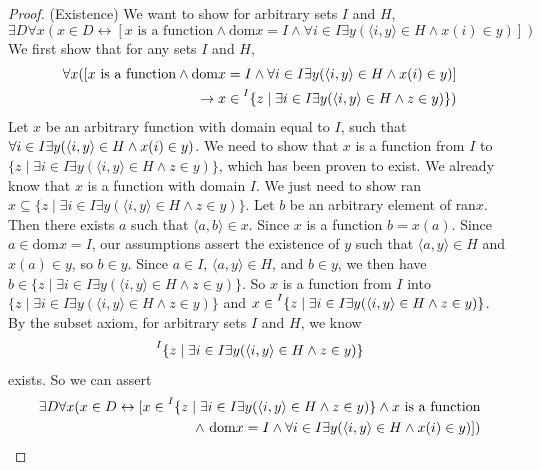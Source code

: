 \documentclass{report}
\begin{document}
\begin{proof}(Existence) 
We want to show for arbitrary sets $I$ and $H$,
\begin{equation*}
\exists D\forall x(x\in D\leftrightarrow[x\text{ is a function}\land\text{dom}x=I\land\forall i\in I\exists y(\langle i,y\rangle\in H\land x(i)\in y)])
\end{equation*}
We first show that for any sets $I$ and $H$,
\begin{align*}
\forall x([x\text{ is a function}\land\text{dom}x=I\land\forall i\in I\exists y(\langle i,y\rangle\in H\land x(i)\in y)]\\\to x\in\prescript{I}{}{\{z\mid\exists i\in I\exists 
y(\langle i,y\rangle\in H\land z\in y)\}})
\end{align*}
Let $x$ be an arbitrary function with domain equal to $I$, such that $\forall i\in I\exists y(\langle i,y\rangle\\\in H\land x(i)\in y)$. We need to show that $x$ is a function from $I$ to 
$\{z\mid\exists i\in I\exists y(\langle i,y\rangle\in H\land z\in y)\}$, which has been proven to exist. 
We already know that $x$ is a function with domain $I$. We just need to show ran$x\subseteq\{z\mid\exists i\in I\exists y(\langle i,y\rangle\in H\land z\in y)\}$. 
Let $b$ be an arbitrary element of ran$x$. Then there exists $a$ such that $\langle a,b\rangle\in x$. Since $x$ is a function $b=x(a)$. Since $a\in\text{dom}x=I$, our assumptions 
assert the existence of $y$ such that $\langle a,y\rangle\in H$ and $x(a)\in y$, so $b\in y$.
Since $a\in I$, $\langle a,y\rangle\in H$, and $b\in y$, we then have $b\in \{z\mid\exists i\in I\exists y(\langle i,y\rangle\in H\land z\in y)\}$. 
So $x$ is a function from $I$ into $\{z\mid\exists i\in I\exists y(\langle i,y\rangle\in H\land z\in y)\}$ and 
$x\in\prescript{I}{}{\{z\mid\exists i\in I\exists y(\langle i,y\rangle\in H\land z\in y)\}}$.\\
\indent By the subset axiom, for arbitrary sets $I$ and $H$, we know 
\begin{equation*}
\prescript{I}{}{\{z\mid\exists i\in I\exists y(\langle i,y\rangle\in H\land z\in y)\}}
\end{equation*}
exists. So we can assert
\begin{align*}
\exists D\forall x(x\in D\leftrightarrow[x\in\prescript{I}{}{\{z\mid\exists i\in I\exists y(\langle i,y\rangle\in H\land z\in y)\}}\land x\text{ is a function}\\\land\text{ dom}x=I\land\forall i\in I\exists y(\langle i,y\rangle\in H\land x(i)\in y)])

\end{align*}
\end{proof}
\end{document}
